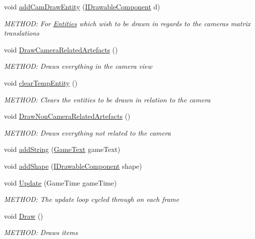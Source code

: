 \begin{DoxyCompactItemize}
void \hyperlink{a00526_a9b6bcc0390e87b334c36c1083e0af5f6}{add\+Cam\+Draw\+Entity} (\hyperlink{a00454}{I\+Drawable\+Component} d)
\begin{DoxyCompactList}\small\item\em M\+E\+T\+H\+OD\+: For \hyperlink{a00269}{Entities} which wish to be drawn in regards to the cameras matrix translations \end{DoxyCompactList}\item 
void \hyperlink{a00526_a93c2cea1133bb38a01336b3d4c6b0321}{Draw\+Camera\+Related\+Artefacts} ()
\begin{DoxyCompactList}\small\item\em M\+E\+T\+H\+OD\+: Draws everything in the camera view \end{DoxyCompactList}\item 
void \hyperlink{a00526_af77caeb94739b508306100cdedfcbd9b}{clear\+Temp\+Entity} ()
\begin{DoxyCompactList}\small\item\em M\+E\+T\+H\+OD\+: Clears the entities to be drawn in relation to the camera \end{DoxyCompactList}\item 
void \hyperlink{a00526_a0dfca7db5472741f87837e7f87e90129}{Draw\+Non\+Camera\+Related\+Artefacts} ()
\begin{DoxyCompactList}\small\item\em M\+E\+T\+H\+OD\+: Draws everything not related to the camera \end{DoxyCompactList}\item 
void \hyperlink{a00526_a9ce9959462da544f283ab3e531bd1edb}{add\+String} (\hyperlink{a00598}{Game\+Text} game\+Text)
\item 
void \hyperlink{a00526_a9d572b8cd8ba3c6cac622dee8d14f2a1}{add\+Shape} (\hyperlink{a00454}{I\+Drawable\+Component} shape)
\item 
void \hyperlink{a00526_a7b63b947d986ab05b66c4c9f78ee3c20}{Update} (Game\+Time game\+Time)
\begin{DoxyCompactList}\small\item\em M\+E\+T\+H\+OD\+: The update loop cycled through on each frame \end{DoxyCompactList}\item 
void \hyperlink{a00526_ae9fd08da224435b71540e67f718eb7c4}{Draw} ()
\begin{DoxyCompactList}\small\item\em M\+E\+T\+H\+OD\+: Draws items \end{DoxyCompactList}\item 

\end{DoxyCompactItemize}
